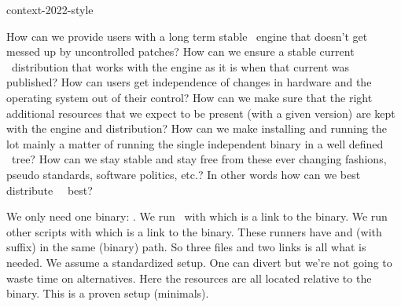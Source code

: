 
\environment context-2022-style

\startdocument
  [title={The LMTX distribution},
   banner={keep it simple},
   location={context\enspace {\bf 2022}\enspace meeting}]

\starttitle[title=The challenge]

\startitemize
    \startitem
        How can we provide users with a long term stable \LUAMETATEX\ engine that
        doesn't get messed up by uncontrolled patches?
    \stopitem
    \startitem
        How can we ensure a stable current \CONTEXT\ distribution that works with the
        engine as it is when that current was published?
    \stopitem
    \startitem
        How can users get independence of changes in hardware and the operating
        system out of their control?
    \stopitem
    \startitem
        How can we make sure that the right additional resources that we expect to
        be present (with a given version) are kept with the engine and distribution?
    \stopitem
    \startitem
        How can we make installing and running the lot mainly a matter of running the
        single independent binary in a well defined \TEX\ tree?
    \stopitem
    \startitem
        How can we stay stable and stay free from these ever changing fashions,
        pseudo standards, software politics, etc.?
    \stopitem
    \startitem
        In other words how can we best distribute \CONTEXT\ \LMTX\ best?
    \stopitem
\stopitemize

\stoptitle

\starttitle[title=Running]

\startitemize
    \startitem
        We only need one binary: .
    \stopitem
    \startitem
        We run \CONTEXT\ with  which is a link to the binary.
    \stopitem
    \startitem
        We run other scripts with  which is a link to the binary.
    \stopitem
    \startitem
        These runners have  and  (with
        suffix) in the same (binary) path.
    \stopitem
    \startitem
        So three files and two links is all what is needed.
    \stopitem
    \startitem
        We assume a standardized setup. One can divert but we're not going to
        waste time on alternatives.
    \stopitem
    \startitem
        Here the resources are all located relative to the binary. This is a
        proven setup (minimals).
    \stopitem
\stopitemize

\stoptitle

